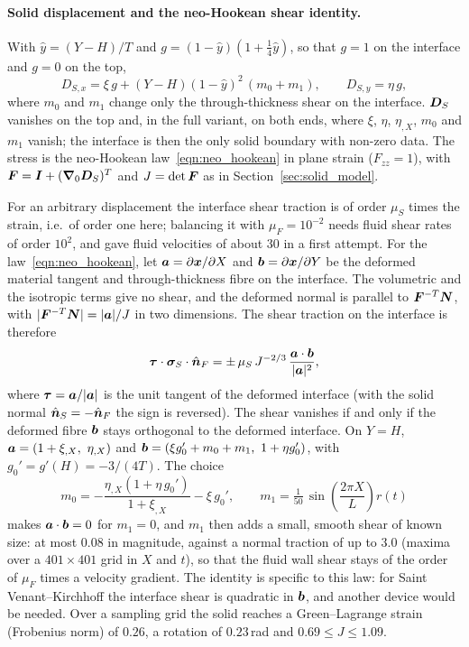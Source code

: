 \paragraph{Solid displacement and the neo-Hookean shear identity.}
With $\hat{y} = (Y - H)/T$ and $g = (1 - \hat{y})(1 + \tfrac14\hat{y})$, so that $g = 1$ on the interface and $g = 0$ on the top,
\begin{equation}
	D_{S,x} = \xi\,g + (Y - H)(1 - \hat{y})^2\,(m_0 + m_1), \qquad
	D_{S,y} = \eta\,g ,
	\label{eq:mms_DS}
\end{equation}
where $m_0$ and $m_1$ change only the through-thickness shear on the interface.
$\boldsymbol{D}_S$ vanishes on the top and, in the full variant, on both ends, where $\xi$, $\eta$, $\eta_{,X}$, $m_0$ and $m_1$ vanish; the interface is then the only solid boundary with non-zero data.
The stress is the neo-Hookean law~\eqref{eqn:neo_hookean} in plane strain ($F_{zz} = 1$), with $\boldsymbol{F} = \boldsymbol{I} + (\boldsymbol{\nabla}_0\boldsymbol{D}_S)^T$ and $J = \det\boldsymbol{F}$ as in Section~\ref{sec:solid_model}.

For an arbitrary displacement the interface shear traction is of order $\mu_S$ times the strain, i.e.\ of order one here; balancing it with $\mu_F = 10^{-2}$ needs fluid shear rates of order $10^2$, and gave fluid velocities of about 30 in a first attempt.
For the law~\eqref{eqn:neo_hookean}, let $\boldsymbol{a} = \partial\boldsymbol{x}/\partial X$ and $\boldsymbol{b} = \partial\boldsymbol{x}/\partial Y$ be the deformed material tangent and through-thickness fibre on the interface.
The volumetric and the isotropic terms give no shear, and the deformed normal is parallel to $\boldsymbol{F}^{-T}\boldsymbol{N}$, with $|\boldsymbol{F}^{-T}\boldsymbol{N}| = |\boldsymbol{a}|/J$ in two dimensions.
The shear traction on the interface is therefore
\begin{equation}
	\boldsymbol{\tau}\cdot\boldsymbol{\sigma}_S\cdot\hat{\boldsymbol{n}}_F = \pm\,\mu_S\,J^{-2/3}\,\frac{\boldsymbol{a}\cdot\boldsymbol{b}}{|\boldsymbol{a}|^2},
	\label{eq:mms_shear}
\end{equation}
where $\boldsymbol{\tau} = \boldsymbol{a}/|\boldsymbol{a}|$ is the unit tangent of the deformed interface (with the solid normal $\hat{\boldsymbol{n}}_S = -\hat{\boldsymbol{n}}_F$ the sign is reversed).
The shear vanishes if and only if the deformed fibre $\boldsymbol{b}$ stays orthogonal to the deformed interface.
On $Y = H$, $\boldsymbol{a} = (1 + \xi_{,X},\ \eta_{,X})$ and $\boldsymbol{b} = (\xi g_0' + m_0 + m_1,\ 1 + \eta g_0')$, with $g_0' = g'(H) = -3/(4T)$.
The choice
\begin{equation}
	m_0 = -\frac{\eta_{,X}\left(1 + \eta\,g_0'\right)}{1 + \xi_{,X}} - \xi\,g_0', \qquad
	m_1 = \tfrac{1}{50}\,\sin\!\left(\frac{2\pi X}{L}\right) r(t)
	\label{eq:mms_m}
\end{equation}
makes $\boldsymbol{a}\cdot\boldsymbol{b} = 0$ for $m_1 = 0$, and $m_1$ then adds a small, smooth shear of known size: at most $0.08$ in magnitude, against a normal traction of up to $3.0$ (maxima over a $401\times401$ grid in $X$ and $t$), so that the fluid wall shear stays of the order of $\mu_F$ times a velocity gradient.
The identity is specific to this law: for Saint Venant--Kirchhoff the interface shear is quadratic in $\boldsymbol{b}$, and another device would be needed.
Over a sampling grid the solid reaches a Green--Lagrange strain (Frobenius norm) of $0.26$, a rotation of $0.23$\,rad and $0.69 \le J \le 1.09$.

